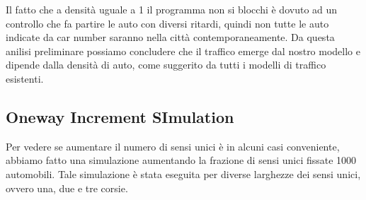 \documentclass[main.tex]{subfiles}
\begin{document}
        Il fatto che a densità uguale a 1 il programma non si blocchi è dovuto ad un controllo che fa partire le auto con diversi ritardi,
        quindi non tutte le auto indicate da car number saranno nella città contemporaneamente.
        Da questa anilisi preliminare possiamo concludere che il traffico emerge dal nostro modello e dipende dalla densità di auto,
        come suggerito da tutti i modelli di traffico esistenti.

    \subsection{Oneway Increment SImulation}
        Per vedere se aumentare il numero di sensi unici è in alcuni casi conveniente, abbiamo fatto una simulazione aumentando la frazione di sensi unici 
        fissate 1000 automobili. Tale simulazione è stata eseguita per diverse larghezze dei sensi unici, ovvero una, due e tre corsie.

    
\end{document}

